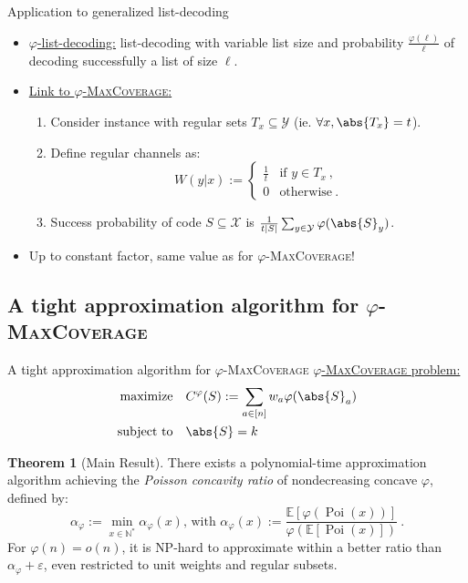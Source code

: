 \documentclass{beamer}
\theoremstyle{definition}
\newtheorem{theo}{Theorem}[section]
\theoremstyle{remark}
\DeclareMathOperator{\Poi}{\text{Poi}}
\DeclareMathOperator{\maxi}{\text{maximize}}
\DeclareMathOperator{\st}{\text{subject to}}
\begin{document}
\begin{frame}{Application to generalized list-decoding}
  \begin{itemize}
  \item \underline{$\varphi$-list-decoding:} list-decoding with variable list size and probability $\frac{\varphi(\ell)}{\ell}$ of decoding successfully a list of size $\ell$.
    \pause
    \bigskip
  \item \underline{Link to $\varphi$-\textsc{MaxCoverage}:}
    \begin{enumerate}
    \item Consider instance with regular sets $T_x \subseteq \mathcal{Y}$ (ie. $\forall x, \abs{T_x}=t$).
    \item Define regular channels as:
    \[ W(y|x) := \begin{cases}
      \frac{1}{t} & \text{if } y \in T_x\ ,\\
      0 & \text{otherwise}\ .
    \end{cases}\]
  \item Success probability of code $S \subseteq \mathcal{X}$ is $\frac{1}{t|S|}\sum_{y \in \mathcal{Y}} \varphi(\abs{S}_y)$.
    \end{enumerate}
    \bigskip
    \pause
  \item Up to constant factor, same value as for $\varphi$-\textsc{MaxCoverage}!
  \end{itemize}
\end{frame}

\subsection{A tight approximation algorithm for $\varphi$-\textsc{MaxCoverage}}
\begin{frame}{A tight approximation algorithm for $\varphi$-\textsc{MaxCoverage}}
  \underline{$\varphi$-\textsc{MaxCoverage} problem:}
    \begin{align*}
      \maxi &&& C^{\varphi}(S) := \sum_{a \in [n]} w_a\varphi(\abs{S}_a)\\
      \st &&& \abs{S} = k
    \end{align*}

  \pause
  
  \begin{theo}[Main Result]
    There exists a polynomial-time approximation algorithm achieving the \emph{Poisson concavity ratio} of nondecreasing concave $\varphi$, defined by:
    \[ \alpha_{\varphi} := \min_{x \in \mathbb{N}^*} \alpha_{\varphi}(x) \text{, with } \alpha_{\varphi}(x) := \frac{\mathbb{E}[\varphi(\Poi(x))]}{\varphi(\mathbb{E}[\Poi(x)])}\ .\]
    For $\varphi(n) = o(n)$, it is \textrm{NP}-hard to approximate within a better ratio than $\alpha_\varphi + \varepsilon$, even restricted to unit weights and regular subsets.
  \end{theo}
\end{frame}
\end{document}

